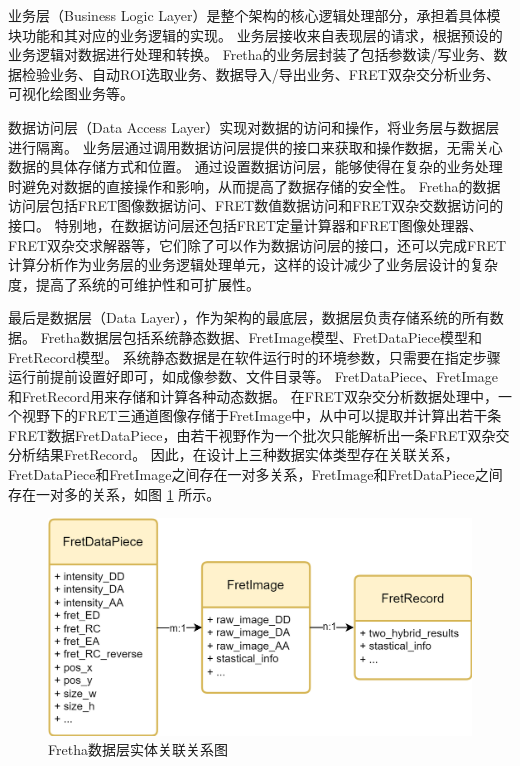 业务层（Business Logic Layer）是整个架构的核心逻辑处理部分，承担着具体模块功能和其对应的业务逻辑的实现。
业务层接收来自表现层的请求，根据预设的业务逻辑对数据进行处理和转换。
Fretha的业务层封装了包括参数读/写业务、数据检验业务、自动ROI选取业务、数据导入/导出业务、FRET双杂交分析业务、可视化绘图业务等。

数据访问层（Data Access Layer）实现对数据的访问和操作，将业务层与数据层进行隔离。
业务层通过调用数据访问层提供的接口来获取和操作数据，无需关心数据的具体存储方式和位置。
通过设置数据访问层，能够使得在复杂的业务处理时避免对数据的直接操作和影响，从而提高了数据存储的安全性。
Fretha的数据访问层包括FRET图像数据访问、FRET数值数据访问和FRET双杂交数据访问的接口。
特别地，在数据访问层还包括FRET定量计算器和FRET图像处理器、FRET双杂交求解器等，它们除了可以作为数据访问层的接口，还可以完成FRET计算分析作为业务层的业务逻辑处理单元，这样的设计减少了业务层设计的复杂度，提高了系统的可维护性和可扩展性。

最后是数据层（Data Layer），作为架构的最底层，数据层负责存储系统的所有数据。
Fretha数据层包括系统静态数据、FretImage模型、FretDataPiece模型和FretRecord模型。
系统静态数据是在软件运行时的环境参数，只需要在指定步骤运行前提前设置好即可，如成像参数、文件目录等。
FretDataPiece、FretImage和FretRecord用来存储和计算各种动态数据。
在FRET双杂交分析数据处理中，一个视野下的FRET三通道图像存储于FretImage中，从中可以提取并计算出若干条FRET数据FretDataPiece，由若干视野作为一个批次只能解析出一条FRET双杂交分析结果FretRecord。
因此，在设计上三种数据实体类型存在关联关系，FretDataPiece和FretImage之间存在一对多关系，FretImage和FretDataPiece之间存在一对多的关系，如图 \ref{fig:fretha_data_relations} 所示。
\begin{figure}[hbtp]
    \centering
    \includegraphics[width=1\linewidth]{../figures/2/Fretha数据模型.drawio.png}
    \caption{Fretha数据层实体关联关系图}
    \label{fig:fretha_data_relations}
\end{figure}

